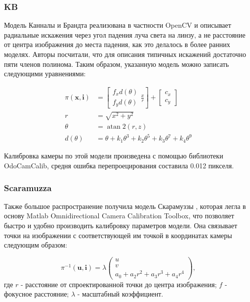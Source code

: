 \subsubsection{KB}

Модель Канналы и 
Брандта \cite{opencv_model} реализована в частности OpenCV и описывает радиальные искажения через угол падения луча света на линзу, а не расстояние  
от центра изображения до места падения, как это делалось в более ранних моделях. Авторы посчитали, что для описания типичных искажений достаточно 
пяти членов полинома. Таким образом, указанную модель можно записать следующими уравнениями:

\begin{equation}
\begin{aligned}
	\pi(\mathbf{x}, \mathbf{i}) &=\left[\begin{array}{l}
	f_{x} d(\theta) \\
	f_{y} d(\theta)
	\end{array} \frac{x}{r}\right]+\left[\begin{array}{c}
	c_{x} \\
	c_{y}
	\end{array}\right] \\
	r &=\sqrt{x^{2}+y^{2}} \\
	\theta &=\operatorname{atan} 2(r, z) \\
	d(\theta) &=\theta+k_{1} \theta^{3}+k_{2} \theta^{5}+k_{3} \theta^{7}+k_{4} \theta^{9}
\end{aligned}
\end{equation}

Калибровка камеры по этой модели произведена с помощью библиотеки OdoCamCalib, средня ошибка перепроецирования 
составила 0.012 пикселя. 

\subsubsection{Scaramuzza}

Также большое распространение получила модель Скарамуззы \cite{scaramuzza}, которая легла в основу Matlab Omnidirectional 
Camera Calibration Toolbox, что позволяет быстро и удобно производить калибровку параметров модели.  Она связывает точки 
на изображении с соответствующей им точкой в координатах камеры следующим образом:

\begin{equation}	
    \pi^{-1}(\mathbf{u}, \mathbf{i}) = \lambda \begin{pmatrix}u\\v\\a_0 + a_2 r^2 + a_3 r^3 + a_4 r^4\end{pmatrix},
    \label{eqn:scaramuzza}
\end{equation}
где  $r$ - расстояние от спроектированной точки до центра изображения; $f$ - фокусное расстояние; $\lambda$ - масштабный коэффициент.

